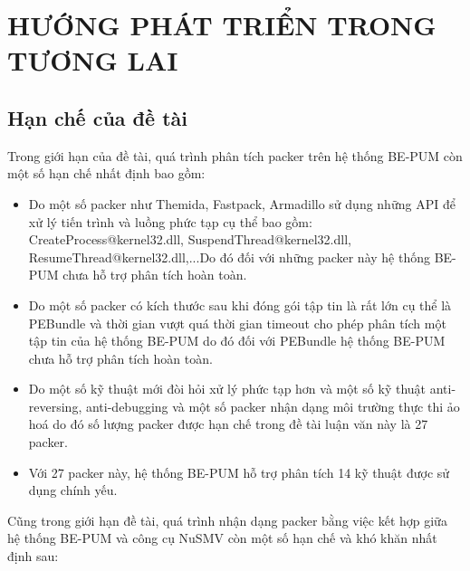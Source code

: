 
\newpage
\chapter{HƯỚNG PHÁT TRIỂN TRONG TƯƠNG LAI}

\section{Hạn chế của đề tài}

\hspace{0.5cm}Trong giới hạn của đề tài, quá trình phân tích packer trên hệ thống BE-PUM còn một số hạn chế nhất định bao gồm:

\begin{itemize}
\item{Do một số packer như Themida, Fastpack, Armadillo sử dụng những API để xử lý tiến trình và luồng phức tạp cụ thể bao gồm: CreateProcess@kernel32.dll, SuspendThread@kernel32.dll, ResumeThread@kernel32.dll,...Do đó đối với những packer này hệ thống BE-PUM chưa hỗ trợ phân tích hoàn toàn.\\}
\item{Do một số packer có kích thước sau khi đóng gói tập tin là rất lớn cụ thể là PEBundle và thời gian vượt quá thời gian timeout cho phép phân tích một tập tin của hệ thống BE-PUM do đó đối với PEBundle hệ thống BE-PUM chưa hỗ trợ phân tích hoàn toàn.\\}
\item{Do một số kỹ thuật mới đòi hỏi xử lý phức tạp hơn và một số kỹ thuật anti-reversing, anti-debugging và một số packer nhận dạng môi trường thực thi ảo hoá do đó số lượng packer được hạn chế trong đề tài luận văn này là 27 packer.\\}
\item{Với 27 packer này, hệ thống BE-PUM hỗ trợ phân tích 14 kỹ thuật được sử dụng chính yếu.}
\end{itemize}

\hspace{0.5cm}Cũng trong giới hạn đề tài, quá trình nhận dạng packer bằng việc kết hợp giữa hệ thống BE-PUM và công cụ NuSMV còn một số hạn chế và khó khăn nhất định sau:

